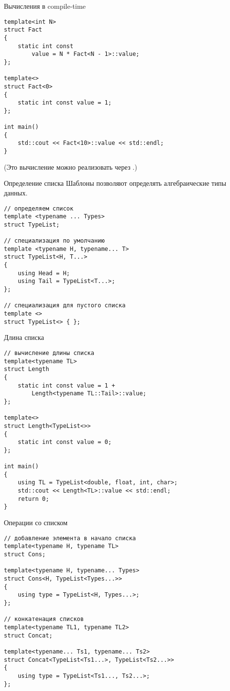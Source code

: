 \documentclass[aspectration=1610]{beamer}
\begin{document}
\begin{frame}[fragile]{Вычисления в compile-time}
\begin{lstlisting}
template<int N> 
struct Fact 
{
    static int const
        value = N * Fact<N - 1>::value;
};

template<> 
struct Fact<0> 
{
    static int const value = 1;
};

int main() 
{
    std::cout << Fact<10>::value << std::endl;
}
\end{lstlisting}

(Это вычисление можно реализовать через .) 
\end{frame}


\begin{frame}[fragile]{Определение списка}
Шаблоны позволяют определять алгебраические типы данных.
\begin{lstlisting}
// определяем список
template <typename ... Types>
struct TypeList; 

// специализация по умолчанию
template <typename H, typename... T>
struct TypeList<H, T...> 
{
    using Head = H;
    using Tail = TypeList<T...>;
};

// специализация для пустого списка
template <>
struct TypeList<> { };
\end{lstlisting}
\end{frame}

\begin{frame}[fragile]{Длина списка}
\begin{lstlisting}
// вычисление длины списка
template<typename TL>
struct Length
{
    static int const value = 1 +
        Length<typename TL::Tail>::value;
};

template<>
struct Length<TypeList<>>
{
    static int const value = 0;
};

int main()
{
    using TL = TypeList<double, float, int, char>;
    std::cout << Length<TL>::value << std::endl;
    return 0;
}
\end{lstlisting}
\end{frame}

\begin{frame}[fragile]{Операции со списком}
\begin{lstlisting}
// добавление элемента в начало списка
template<typename H, typename TL>
struct Cons;

template<typename H, typename... Types>
struct Cons<H, TypeList<Types...>>
{
    using type = TypeList<H, Types...>;
};

// конкатенация списков
template<typename TL1, typename TL2>
struct Concat;

template<typename... Ts1, typename... Ts2>
struct Concat<TypeList<Ts1...>, TypeList<Ts2...>>
{
    using type = TypeList<Ts1..., Ts2...>;
};
\end{lstlisting}
\end{frame}
\end{document}
